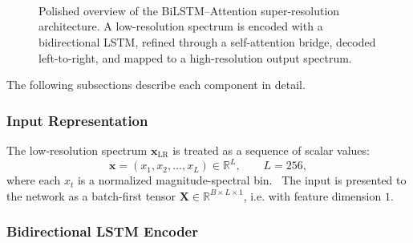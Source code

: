 \documentclass[12pt,a4paper]{report}
\begin{document}
\begin{figure}[htbp]
{%
  }

  \caption{Polished overview of the BiLSTM--Attention super-resolution architecture. A low-resolution spectrum is encoded with a bidirectional LSTM, refined through a self-attention bridge, decoded left-to-right, and mapped to a high-resolution output spectrum.}
  \label{fig:model_arch}
\end{figure}

\bigskip

The following subsections describe each component in detail.

\bigskip
\subsubsection{Input Representation}

The low-resolution spectrum $\mathbf{x}_{\mathrm{LR}}$ is treated as a sequence of scalar values:
\begin{equation}
\mathbf{x} = (x_1, x_2, \dots, x_L) \in \mathbb{R}^{L}, \qquad L = 256,
\end{equation}
where each $x_t$ is a normalized magnitude-spectral bin.  The input is presented to the network as a batch-first tensor $\mathbf{X} \in \mathbb{R}^{B \times L \times 1}$, i.e. with feature dimension $1$.

\bigskip
\subsubsection{Bidirectional LSTM Encoder}
\end{document}
